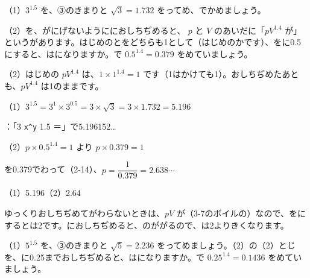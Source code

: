 \begin{reidai}[\R{整数}{せい|すう}でない\R{指数}{し|すう}と\R{電卓}{でん|たく}]
（1）$3^{1.5}$ を、③のきまりと $\sqrt{3}=1.732$ をってめ、でかめましょう。\par
（2）を、がにげないようににおしちぢめると、 $p$ と $V$ のあいだに「$pV^{1.4}$ が」というがあります。はじめのとをどちらも1として（はじめのかです）、をに0.5にすると、はになりますか。で $0.5^{1.4}=0.379$ をめていましょう。\par
\kangaekata （2）はじめの $pV^{1.4}$ は、$1\times1^{1.4}=1$ です（1はかけても1）。おしちぢめたあとも、$pV^{1.4}$ は1のままです。\par
\shiki（1）\nobreak $3^{1.5}=3^1\times3^{0.5}=3\times\sqrt{3}=3\times1.732=5.196$\par
\hspace*{2.6\zw}：「3 \texttt{x\^{}y} 1.5 ＝」で5.196152…\par
\hspace*{2.6\zw}（2）\nobreak $p\times0.5^{1.4}=1$ より $p\times0.379=1$\par
\hspace*{2.6\zw}を0.379でわって（2-14）、$p=\dfrac{1}{0.379}=2.638\cdots$\par
\kotae（1）\nobreak {}5.196\quad（2）\nobreak {}2.64
\end{reidai}
\noindent ゆっくりおしちぢめてがわらないときは、$pV$ が（3-7のボイルの）なので、をにするとは2です。におしちぢめると、のががるので、は2よりきくなります。

\begin{jibun}
（1）$5^{1.5}$ を、③のきまりと $\sqrt{5}=2.236$ をってめましょう。（2）の（2）とじを、に0.25までおしちぢめると、はになりますか。で $0.25^{1.4}=0.1436$ をめていましょう。
\end{jibun}

